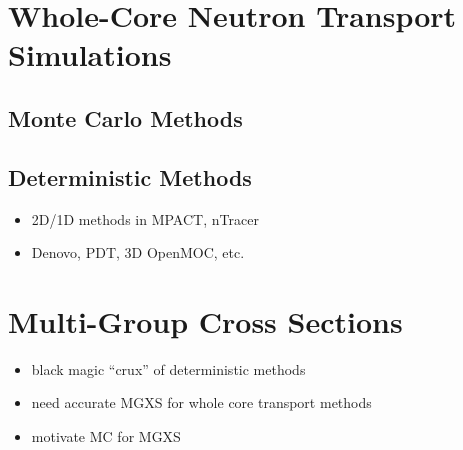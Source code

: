 \section{Whole-Core Neutron Transport Simulations}
\label{sec:chap1-whole-core-transport}


\subsection{Monte Carlo Methods}
\label{subsec:chap1-monte-carlo}


\subsection{Deterministic Methods}
\label{subsec:chap1-deterministic}

\begin{itemize}
  \item 2D/1D methods in MPACT, nTracer
  \item Denovo, PDT, 3D OpenMOC, etc.
\end{itemize}


\section{Multi-Group Cross Sections}
\label{sec:chap1-mgxs}

\begin{itemize}
  \item black magic ``crux'' of deterministic methods
  \item need accurate \ac{MGXS} for whole core transport methods
  \item motivate \ac{MC} for \ac{MGXS}
\end{itemize}

